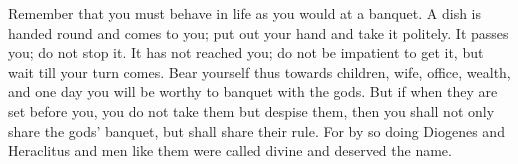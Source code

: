 Remember that  you must behave  in life as  you would at  a banquet. A  dish is
handed round  and comes  to you;  put out your  hand and  take it  politely. It
passes you; do not stop it. It has  not reached you; do not be impatient to get
it, but wait  till your turn comes. Bear yourself  thus towards children, wife,
office, wealth, and one day you will be worthy to banquet with the gods. But if
when they are set  before you, you do not take them but  despise them, then you
shall not only share  the gods' banquet, but shall share their  rule. For by so
doing Diogenes and Heraclitus and men like them were called divine and deserved
the name.
